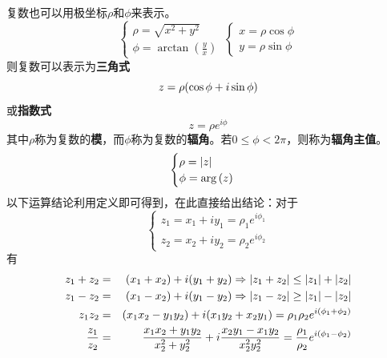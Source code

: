 \documentclass[12pt,a4paper,openany,twoside]{book}
\numberwithin{equation}{section}
\begin{document}
          复数也可以用极坐标$\rho$和$\phi$来表示。
          \begin{equation}
            \begin{cases}
              \rho=\sqrt{x^2+y^2}\\
              \phi=\arctan(\frac{y}{x})
            \end{cases}\ \begin{cases}
              x=\rho\cos\phi\\
              y=\rho\sin\phi
            \end{cases}
          \end{equation}
          则复数可以表示为\textbf{三角式}
          \begin{equation}
            z=\rho\qty(\cos\phi+i\sin\phi)
          \end{equation}
          或\textbf{指数式}
          \begin{equation}
            z=\rho e^{i\phi}
          \end{equation}
          其中$\rho$称为复数的\textbf{模}，而$\phi$称为复数的\textbf{辐角}。若$0\leq\phi<2\pi$，则称为\textbf{辐角主值}。
          \begin{equation}
            \begin{cases}
              \rho=\abs{z}\\
              \phi=\arg\qty(z)
            \end{cases}
          \end{equation}
          以下运算结论利用定义即可得到，在此直接给出结论：对于
          \begin{equation*}
            \begin{cases}
              z_1=x_1+iy_1=\rho_1 e^{i\phi_1}\\
              z_2=x_2+iy_2=\rho_2 e^{i\phi_2}
            \end{cases}
          \end{equation*}
          有
          \begin{eqnarray}
            z_1+z_2&=&\qty(x_1+x_2)+i\qty(y_1+y_2)\Rightarrow\abs{z_1+z_2}\leq\abs{z_1}+\abs{z_2}\\
            z_1-z_2&=&\qty(x_1-x_2)+i\qty(y_1-y_2)\Rightarrow\abs{z_1-z_2}\geq\abs{z_1}-\abs{z_2}\\
            z_1z_2&=&\qty(x_1x_2-y_1y_2)+i\qty(x_1y_2+x_2y_1)=\rho_1\rho_2 e^{i\qty(\phi_1+\phi_2)}\\
            \frac{z_1}{z_2}&=&\frac{x_1x_2+y_1y_2}{x_2^2+y_2^2}+i\frac{x_2y_1-x_1y_2}{x_2^2y_2^2}=\frac{\rho_1}{\rho_2}e^{i\qty(\phi_1-\phi_2)}
          \end{eqnarray}
\end{document}
